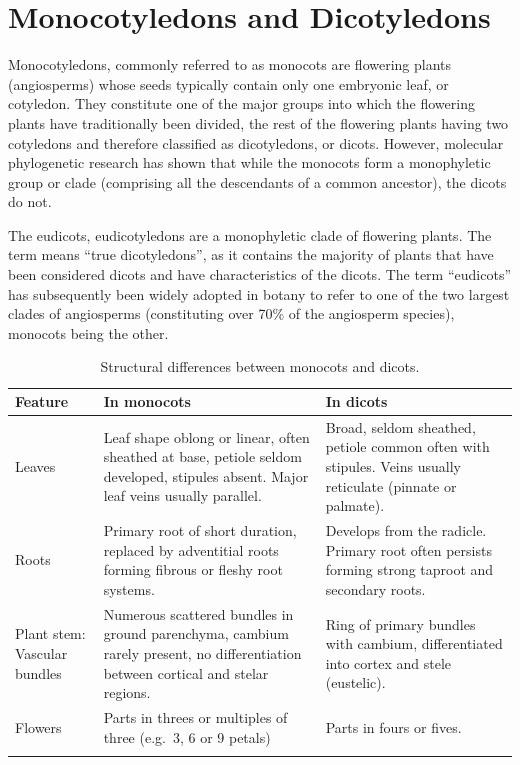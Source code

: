 \documentclass[]{book}
\theoremstyle{definition}
\theoremstyle{definition}
\theoremstyle{definition}
\theoremstyle{remark}
\begin{document}
\section{Monocotyledons and
Dicotyledons}\label{monocotyledons-and-dicotyledons}

Monocotyledons, commonly referred to as monocots are flowering plants
(angiosperms) whose seeds typically contain only one embryonic leaf, or
cotyledon. They constitute one of the major groups into which the
flowering plants have traditionally been divided, the rest of the
flowering plants having two cotyledons and therefore classified as
dicotyledons, or dicots. However, molecular phylogenetic research has
shown that while the monocots form a monophyletic group or clade
(comprising all the descendants of a common ancestor), the dicots do
not.

The eudicots, eudicotyledons are a monophyletic clade of flowering
plants. The term means ``true dicotyledons'', as it contains the
majority of plants that have been considered dicots and have
characteristics of the dicots. The term ``eudicots'' has subsequently
been widely adopted in botany to refer to one of the two largest clades
of angiosperms (constituting over 70\% of the angiosperm species),
monocots being the other.

\begin{table}[h!]
\centering
\caption{Structural differences between monocots and
dicots.}\label{tab:moncots}
\begin{tabularx}{\columnwidth}{YYY} \\
\toprule
Feature & In monocots & In dicots \\
\midrule
Leaves &
Leaf shape oblong or linear, often sheathed at base, petiole seldom
developed, stipules absent. Major leaf veins usually parallel. &
Broad, seldom sheathed, petiole common often with stipules. Veins
usually reticulate (pinnate or palmate).\\
Roots &
Primary root of short duration, replaced by adventitial roots forming
fibrous or fleshy root systems. &
Develops from the radicle. Primary root often persists forming strong
taproot and secondary roots. \\
Plant stem: Vascular bundles &
Numerous scattered bundles in ground parenchyma, cambium rarely present,
no differentiation between cortical and stelar regions. & Ring of primary bundles with cambium, differentiated into cortex and
stele (eustelic).\\
Flowers & Parts in threes or multiples of three (e.g.~3, 6 or 9 petals) & Parts in fours or fives.\\
\bottomrule \\
\end{tabularx}
\end{table}
\end{document}

